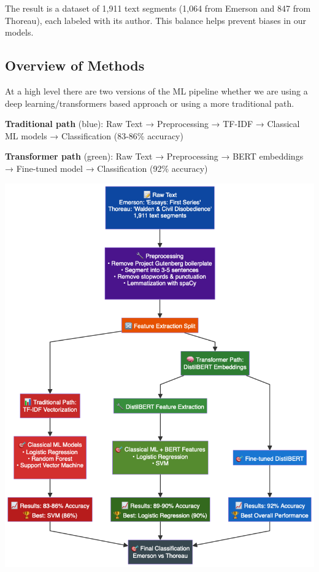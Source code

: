 \documentclass[
]{article}
\begin{document}
The result is a dataset of 1,911 text segments (1,064 from Emerson and
847 from Thoreau), each labeled with its author. This balance helps
prevent biases in our models.

\subsection{Overview of Methods}\label{overview-of-methods}

At a high level there are two versions of the ML pipeline whether we are
using a deep learning/transformers based approach or using a more
traditional path.

\textbf{Traditional path} (blue): Raw Text → Preprocessing → TF-IDF →
Classical ML models → Classification (83-86\% accuracy)

\textbf{Transformer path} (green): Raw Text → Preprocessing → BERT
embeddings → Fine-tuned model → Classification (92\% accuracy)

\includegraphics[width=8.33333in,height=\textheight]{image-20250611165131252.png}
\end{document}
